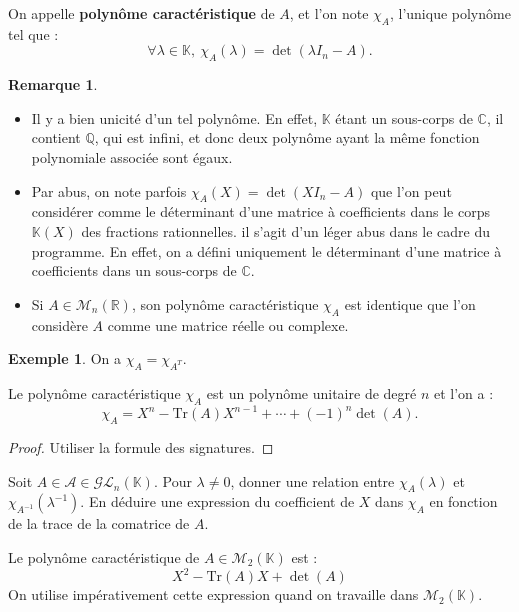 \documentclass[french]{article}
\newcommand{\Q}{\mathbb{Q}}
\newcommand{\R}{\mathbb{R}}
\newcommand{\C}{\mathbb{C}}
\newcommand{\K}{\mathbb{K}}
\newcommand{\inv}{^{-1}}
\newcommand{\Tr}{\text{Tr}}
\theoremstyle{plain}
\theoremstyle{definition}
\newtheorem*{ex}{Exemple}
\newtheorem*{rmq}{Remarque}
\theoremstyle{remark}
\begin{document}
	\begin{dfn}
		On appelle \textbf{polynôme caractéristique} de $A$, et l'on note $\chi_A$, l'unique polynôme tel que : $$\forall\lambda\in\K,\ \chi_A(\lambda)=\det(\lambda I_n-A).$$
	\end{dfn}
	
	\begin{rmq}
		\begin{itemize}
			\item Il y a bien unicité d'un tel polynôme. En effet, $\K$ étant un sous-corps de $\C$, il contient $\Q$, qui est infini, et donc deux polynôme ayant la même fonction polynomiale associée sont égaux.
			\item Par abus, on note parfois $\chi_A(X)=\det(XI_n-A)$ que l'on peut considérer comme le déterminant d'une matrice à coefficients dans le corps $\K(X)$ des fractions rationnelles. il s'agit d'un léger abus dans le cadre du programme. En effet, on a défini uniquement le déterminant d'une matrice à coefficients dans un sous-corps de $\C$.
			\item Si $A\in\mathcal{M}_n(\R)$, son polynôme caractéristique $\chi_A$ est identique que l'on considère $A$ comme une matrice réelle ou complexe.
		\end{itemize}
	\end{rmq}
	
	\begin{ex}
		On a $\chi_A=\chi_{A^T}$.
	\end{ex}
	
	\begin{prop}%
		Le polynôme caractéristique $\chi_A$ est un polynôme unitaire de degré $n$ et l'on a : $$\chi_A=X^n-\Tr(A)X^{n-1}+\cdots+(-1)^n\det(A).$$
	\end{prop}
	\begin{proof}
		Utiliser la formule des signatures.
	\end{proof}
	
	\begin{exo}
		Soit $A\in\mathcal{A}\in\mathcal{GL}_n(\K)$. Pour $\lambda\ne0$, donner une relation entre $\chi_A(\lambda)$ et $\chi_{A\inv}(\lambda\inv)$. En déduire une expression du coefficient de $X$ dans $\chi_A$ en fonction de la trace de la comatrice de $A$.
	\end{exo}
	
	\begin{met}
		Le polynôme caractéristique de $A\in\mathcal{M}_2(\K)$ est : $$X^2-\Tr(A)X+\det(A)$$ On utilise impérativement cette expression quand on travaille dans $\mathcal{M}_2(\K)$.
	\end{met}
	
\end{document}

